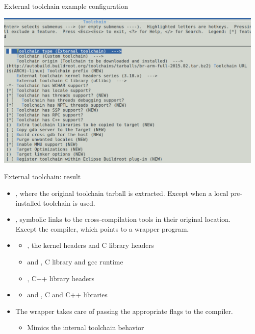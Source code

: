 \begin{frame}{External toolchain example configuration}
  \begin{center}
    \includegraphics[height=0.8\textheight]{slides/buildroot-toolchain/external-toolchain-config.png}
  \end{center}
\end{frame}

\begin{frame}{External toolchain: result}
  \begin{itemize}
  \item {}, where the original toolchain
    tarball is extracted. Except when a local pre-installed toolchain
    is used.
  \item {}, symbolic links to the
    cross-compilation tools in their original location. Except the
    compiler, which points to a wrapper program.
  \item {}
    \begin{itemize}
    \item {}, the kernel headers and C
      library headers
    \item {} and , C library and
      gcc runtime
    \item {}, C++ library headers
    \end{itemize}
  \item {}
    \begin{itemize}
    \item {} and , C and C++ libraries
    \end{itemize}
  \item The wrapper takes care of passing the appropriate flags to the
    compiler.
    \begin{itemize}
    \item Mimics the internal toolchain behavior
    \end{itemize}
  \end{itemize}
\end{frame}

